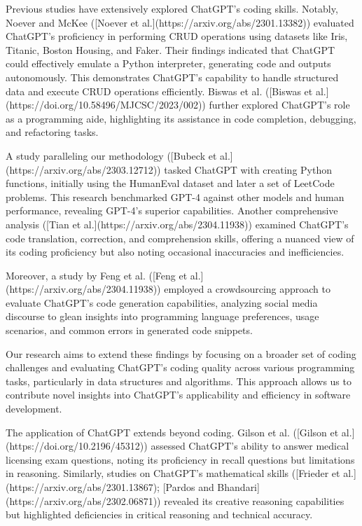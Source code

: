 Previous studies have extensively explored ChatGPT's coding skills. Notably, Noever and McKee ([Noever et al.](https://arxiv.org/abs/2301.13382)) evaluated ChatGPT's proficiency in performing CRUD operations using datasets like Iris, Titanic, Boston Housing, and Faker. Their findings indicated that ChatGPT could effectively emulate a Python interpreter, generating code and outputs autonomously. This demonstrates ChatGPT's capability to handle structured data and execute CRUD operations efficiently. Biswas et al. ([Biswas et al.](https://doi.org/10.58496/MJCSC/2023/002)) further explored ChatGPT's role as a programming aide, highlighting its assistance in code completion, debugging, and refactoring tasks.

A study paralleling our methodology ([Bubeck et al.](https://arxiv.org/abs/2303.12712)) tasked ChatGPT with creating Python functions, initially using the HumanEval dataset and later a set of LeetCode problems. This research benchmarked GPT-4 against other models and human performance, revealing GPT-4's superior capabilities. Another comprehensive analysis ([Tian et al.](https://arxiv.org/abs/2304.11938)) examined ChatGPT's code translation, correction, and comprehension skills, offering a nuanced view of its coding proficiency but also noting occasional inaccuracies and inefficiencies.

Moreover, a study by Feng et al. ([Feng et al.](https://arxiv.org/abs/2304.11938)) employed a crowdsourcing approach to evaluate ChatGPT's code generation capabilities, analyzing social media discourse to glean insights into programming language preferences, usage scenarios, and common errors in generated code snippets.

Our research aims to extend these findings by focusing on a broader set of coding challenges and evaluating ChatGPT's coding quality across various programming tasks, particularly in data structures and algorithms. This approach allows us to contribute novel insights into ChatGPT's applicability and efficiency in software development.

The application of ChatGPT extends beyond coding. Gilson et al. ([Gilson et al.](https://doi.org/10.2196/45312)) assessed ChatGPT's ability to answer medical licensing exam questions, noting its proficiency in recall questions but limitations in reasoning. Similarly, studies on ChatGPT's mathematical skills ([Frieder et al.](https://arxiv.org/abs/2301.13867); [Pardos and Bhandari](https://arxiv.org/abs/2302.06871)) revealed its creative reasoning capabilities but highlighted deficiencies in critical reasoning and technical accuracy.


